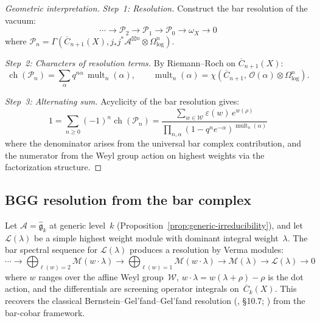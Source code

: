 \begin{proof}[Geometric interpretation]
\emph{Step~1: Resolution.}
Construct the bar resolution of the vacuum:
\[
\cdots \to \mathcal{P}_2 \to \mathcal{P}_1 \to \mathcal{P}_0
\to \omega_X \to 0
\]
where $\mathcal{P}_n = \Gamma(\overline{C}_{n+1}(X),
j_*j^*\mathcal{A}^{\boxtimes n} \otimes \Omega^n_{\log})$.

\emph{Step~2: Characters of resolution terms.}
By Riemann--Roch on $\overline{C}_{n+1}(X)$:
\[
\operatorname{ch}(\mathcal{P}_n)
= \sum_{\alpha} q^{n\alpha}\, \operatorname{mult}_n(\alpha), \qquad
\operatorname{mult}_n(\alpha)
= \chi(\overline{C}_{n+1},\, \mathcal{O}(\alpha)
\otimes \Omega^n_{\log}).
\]

\emph{Step~3: Alternating sum.}
Acyclicity of the bar resolution gives:
\[
1 = \sum_{n \geq 0} (-1)^n \operatorname{ch}(\mathcal{P}_n)
= \frac{\sum_{w \in \mathcal{W}} \varepsilon(w)\, e^{w(\rho)}}
 {\prod_{n,\alpha} (1 - q^n e^{-\alpha})^{\operatorname{mult}_n(\alpha)}}
\]
where the denominator arises from the universal bar complex
contribution, and the numerator from the Weyl group action on
highest weights via the factorization structure.
\end{proof}

\subsection{BGG resolution from the bar complex}

\begin{theorem}
\label{thm:bgg-from-bar}
Let $\mathcal{A} = \widehat{\mathfrak{g}}_k$ at generic level~$k$
(Proposition~\ref{prop:generic-irreducibility}), and let
$\mathcal{L}(\lambda)$ be a simple highest weight module with
dominant integral weight~$\lambda$. The bar spectral sequence for
$\mathcal{L}(\lambda)$ produces a resolution by Verma modules:
\begin{equation}\label{eq:bgg-from-bar}
\cdots \to \bigoplus_{\ell(w)=2} \mathcal{M}(w \cdot \lambda)
\to \bigoplus_{\ell(w)=1} \mathcal{M}(w \cdot \lambda)
\to \mathcal{M}(\lambda) \to \mathcal{L}(\lambda) \to 0
\end{equation}
where $w$ ranges over the affine Weyl
group~$\mathcal{W}$, $w \cdot \lambda = w(\lambda + \rho) - \rho$
is the dot action, and the differentials are screening operator
integrals on~$\overline{C}_k(X)$. This recovers the classical
Bernstein--Gel'fand--Gel'fand resolution
\textup{(\cite{Kac}, \S10.7; \cite{BGG76})} from the bar-cobar
framework.
\end{theorem}


